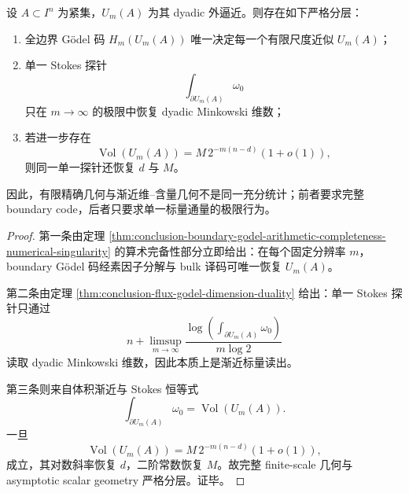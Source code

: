\begin{theorem}[有限精确几何与渐近标量充分性的严格分层]\label{thm:conclusion-boundary-finite-exactness-vs-asymptotic-scalar-sufficiency}
设 \(A\subset I^n\) 为紧集，\(U_m(A)\) 为其 dyadic 外逼近。则存在如下严格分层：
\begin{enumerate}
  \item 全边界 Gödel 码 \(H_m(U_m(A))\) 唯一决定每一个有限尺度近似 \(U_m(A)\)；
  \item 单一 Stokes 探针
  \[
  \int_{\partial U_m(A)}\omega_0
  \]
  只在 \(m\to\infty\) 的极限中恢复 dyadic Minkowski 维数；
  \item 若进一步存在
  \[
  \operatorname{Vol}(U_m(A))=M\,2^{-m(n-d)}(1+o(1)),
  \]
  则同一单一探针还恢复 \(d\) 与 \(M\)。
\end{enumerate}
因此，有限精确几何与渐近维--含量几何不是同一充分统计；前者要求完整 boundary code，后者只要求单一标量通量的极限行为。
\end{theorem}
\begin{proof}
第一条由定理 \ref{thm:conclusion-boundary-godel-arithmetic-completeness-numerical-singularity} 的算术完备性部分立即给出：在每个固定分辨率 \(m\)，boundary Gödel 码经素因子分解与 bulk 译码可唯一恢复 \(U_m(A)\)。

第二条由定理 \ref{thm:conclusion-flux-godel-dimension-duality} 给出：单一 Stokes 探针只通过
\[
n+\limsup_{m\to\infty}\frac{\log\!\left(\int_{\partial U_m(A)}\omega_0\right)}{m\log 2}
\]
读取 dyadic Minkowski 维数，因此本质上是渐近标量读出。

第三条则来自体积渐近与 Stokes 恒等式
\[
\int_{\partial U_m(A)}\omega_0=\operatorname{Vol}(U_m(A)).
\]
一旦
\[
\operatorname{Vol}(U_m(A))=M\,2^{-m(n-d)}(1+o(1)),
\]
成立，其对数斜率恢复 \(d\)，二阶常数恢复 \(M\)。故完整 finite-scale 几何与 asymptotic scalar geometry 严格分层。证毕。
\end{proof}

